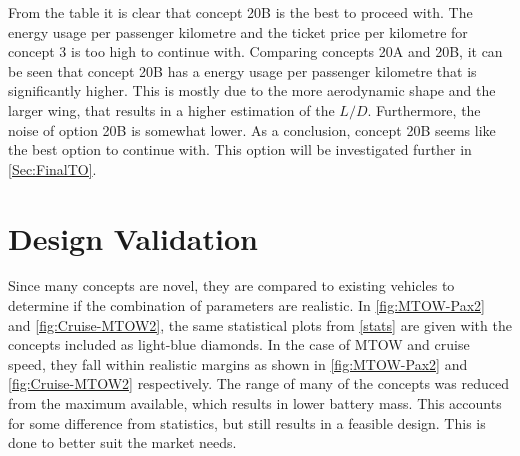 From the table it is clear that concept 20B is the best to proceed with. The energy usage per passenger kilometre and the ticket price per kilometre for concept 3 is too high to continue with. Comparing concepts 20A and 20B, it can be seen that concept 20B has a energy usage per passenger kilometre that is significantly higher. This is mostly due to the more aerodynamic shape and the larger wing, that results in a higher estimation of the $L/D$. Furthermore, the noise of option 20B is somewhat lower. As a conclusion, concept 20B seems like the best option to continue with. This option will be investigated further in \autoref{Sec:FinalTO}.  


\section{Design Validation}
Since many concepts are novel, they are compared to existing vehicles to determine if the combination of parameters are realistic. In \autoref{fig:MTOW-Pax2} and \autoref{fig:Cruise-MTOW2}, the same statistical plots from \autoref{stats} are given with the concepts included as light-blue diamonds. In the case of MTOW and cruise speed, they fall within realistic margins as shown in \autoref{fig:MTOW-Pax2} and \autoref{fig:Cruise-MTOW2} respectively. The range of many of the concepts was reduced from the maximum available, which results in lower battery mass. This accounts for some difference from statistics, but still results in a feasible design. This is done to better suit the market needs.

